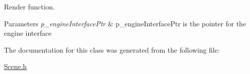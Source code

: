 Render function. 


\begin{DoxyParams}{Parameters}
{\em p\+\_\+engine\+Interface\+Ptr} & p\+\_\+engine\+Interface\+Ptr is the pointer for the engine interface \\
\hline
\end{DoxyParams}


The documentation for this class was generated from the following file\+:\begin{DoxyCompactItemize}
\item 
\mbox{\hyperlink{_scene_8h}{Scene.\+h}}\end{DoxyCompactItemize}
